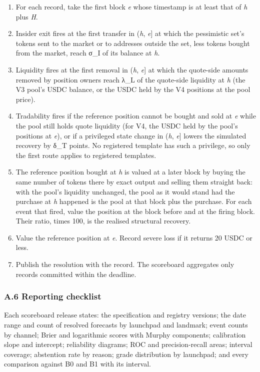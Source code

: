 \begin{enumerate}
\def\labelenumi{\arabic{enumi}.}
\tightlist
\item
  For each record, take the first block \emph{e} whose timestamp is at least that of \emph{h} plus \emph{H}.
\item
  Insider exit fires at the first transfer in (\emph{h}, \emph{e}{]} at which the pessimistic set's tokens sent to the market or to addresses outside the set, less tokens bought from the market, reach σ\_I of its balance at \emph{h}.
\item
  Liquidity fires at the first removal in (\emph{h}, \emph{e}{]} at which the quote-side amounts removed by position owners reach λ\_L of the quote-side liquidity at \emph{h} (the V3 pool's USDC balance, or the USDC held by the V4 positions at the pool price).
\item
  Tradability fires if the reference position cannot be bought and sold at \emph{e} while the pool still holds quote liquidity (for V4, the USDC held by the pool's positions at \emph{e}), or if a privileged state change in (\emph{h}, \emph{e}{]} lowers the simulated recovery by δ\_T points. No registered template has such a privilege, so only the first route applies to registered templates.
\item
  The reference position bought at \emph{h} is valued at a later block by buying the same number of tokens there by exact output and selling them straight back: with the pool's liquidity unchanged, the pool as it would stand had the purchase at \emph{h} happened is the pool at that block plus the purchase. For each event that fired, value the position at the block before and at the firing block. Their ratio, times 100, is the realised structural recovery.
\item
  Value the reference position at \emph{e}. Record severe loss if it returns 20 USDC or less.
\item
  Publish the resolution with the record. The scoreboard aggregates only records committed within the deadline.
\end{enumerate}

\subsubsection{A.6 Reporting checklist}\label{a.6-reporting-checklist}

Each scoreboard release states: the specification and registry versions; the date range and count of resolved forecasts by launchpad and landmark; event counts by channel; Brier and logarithmic scores with Murphy components; calibration slope and intercept; reliability diagrams; ROC and precision-recall areas; interval coverage; abstention rate by reason; grade distribution by launchpad; and every comparison against B0 and B1 with its interval.

